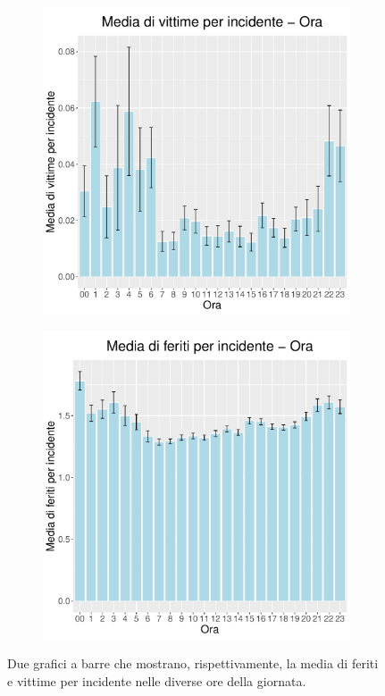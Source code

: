 \documentclass[12pt,a4paper,final,oneside]{article}			%
\begin{document}
        \begin{figure}[h]
            \begin{subfigure}{0.4\textwidth}
                \centering
                \includegraphics[scale=0.4]{../results/media_morti_per_incidente_ora.pdf}
            \end{subfigure}
            \hfill
            \begin{subfigure}{0.4\textwidth}
                \centering
                \includegraphics[scale=0.4]{../results/media_feriti_per_incidente_ora.pdf}
            \end{subfigure}
            \caption{Due grafici a barre che mostrano, rispettivamente, la media di feriti e vittime per incidente nelle diverse ore della giornata.}
            \label{Fig: incidenti_per_ora_morti_feriti}
        \end{figure}
\end{document}
